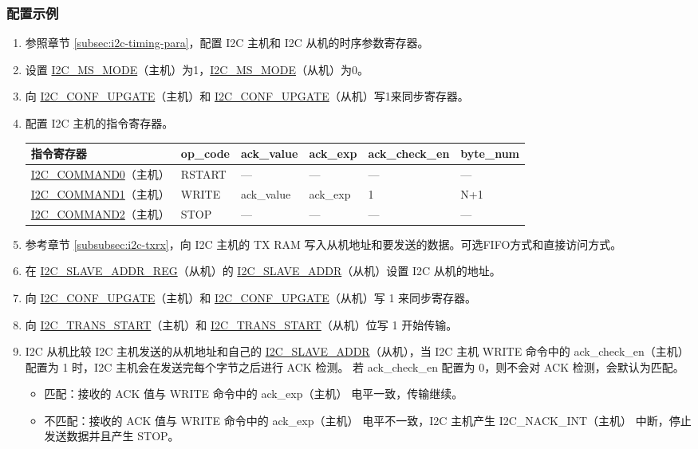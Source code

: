 \documentclass[main\_\_CN.tex]{subfiles}
\begin{document}
\subsubsection{配置示例}
\begin{enumerate}
\item 参照章节 \ref{subsec:i2c-timing-para}，配置 I2C 主机和 I2C 从机的时序参数寄存器。
\item 设置 \hyperref[fielddesc:I2CMSMODE]{I2C\_MS\_MODE}（主机）为1，\hyperref[fielddesc:I2CMSMODE]{I2C\_MS\_MODE}（从机）为0。
\item 向 \hyperref[fielddesc:I2CCONFUPGATE]{I2C\_CONF\_UPGATE}（主机）和 \hyperref[fielddesc:I2CCONFUPGATE]{I2C\_CONF\_UPGATE}（从机）写1来同步寄存器。
\clearpage
\item 配置 I2C 主机的指令寄存器。

\begin{longtable}{ | p{4cm} | p{2cm} | p{2cm} | p{2cm} |p{2cm} | p{2cm} |}
\hline\rowcolor{lightgray}
指令寄存器& op\_code & ack\_value&ack\_exp&ack\_check\_en&byte\_num  \\ \hline
\hyperref[fielddesc:I2CCOMMAND0]{I2C\_COMMAND0}（主机）& RSTART& ---&---&---&---  \\ \hline
\hyperref[fielddesc:I2CCOMMAND1]{I2C\_COMMAND1}（主机）& WRITE& ack\_value&ack\_exp&1&N+1  \\ \hline
\hyperref[fielddesc:I2CCOMMAND2]{I2C\_COMMAND2}（主机）& STOP& ---&---&---&---  \\ \hline
\end{longtable}

\item 参考章节 \ref{subsubsec:i2c-txrx}，向 I2C 主机的 TX RAM 写入从机地址和要发送的数据。可选FIFO方式和直接访问方式。
\item 在 \hyperref[regdesc:I2CSLAVEADDRREG]{I2C\_SLAVE\_ADDR\_REG}（从机）的 \hyperref[fielddesc:I2CSLAVEADDR]{I2C\_SLAVE\_ADDR}（从机）设置 I2C 从机的地址。
\item 向 \hyperref[fielddesc:I2CCONFUPGATE]{I2C\_CONF\_UPGATE}（主机）和 \hyperref[fielddesc:I2CCONFUPGATE]{I2C\_CONF\_UPGATE}（从机）写 1 来同步寄存器。
\item 向 \hyperref[fielddesc:I2CTRANSSTART]{I2C\_TRANS\_START}（主机）和 \hyperref[fielddesc:I2CTRANSSTART]{I2C\_TRANS\_START}（从机）位写 1 开始传输。
\item I2C 从机比较 I2C 主机发送的从机地址和自己的 \hyperref[fielddesc:I2CSLAVEADDR]{I2C\_SLAVE\_ADDR}（从机），当 I2C 主机 WRITE 命令中的 ack\_check\_en（主机）配置为 1 时，I2C 主机会在发送完每个字节之后进行 ACK 检测。 若 ack\_check\_en 配置为 0，则不会对 ACK 检测，会默认为匹配。
\begin{itemize}
\item 匹配：接收的 ACK 值与 WRITE 命令中的 ack\_exp（主机） 电平一致，传输继续。
\item 不匹配：接收的 ACK 值与 WRITE 命令中的 ack\_exp（主机） 电平不一致，I2C 主机产生 I2C\_NACK\_INT（主机） 中断，停止发送数据并且产生 STOP。
\end{itemize}


\end{enumerate}
\end{document}
